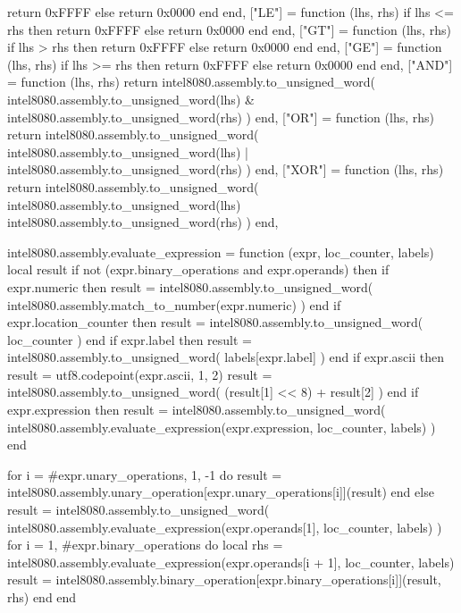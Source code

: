 {            return 0xFFFF
        else
            return 0x0000
        end
    end,
    ["LE"] = function (lhs, rhs)
        if lhs <= rhs then
            return 0xFFFF
        else
            return 0x0000
        end
    end,
    ["GT"] = function (lhs, rhs)
        if lhs > rhs then
            return 0xFFFF
        else
            return 0x0000
        end
    end,
    ["GE"] = function (lhs, rhs)
        if lhs >= rhs then
            return 0xFFFF
        else
            return 0x0000
        end
    end,
    ["AND"] = function (lhs, rhs)
        return intel8080.assembly.to_unsigned_word(
            intel8080.assembly.to_unsigned_word(lhs)
            &
            intel8080.assembly.to_unsigned_word(rhs)
        )
    end,
    ["OR"] = function (lhs, rhs)
        return intel8080.assembly.to_unsigned_word(
            intel8080.assembly.to_unsigned_word(lhs)
            |
            intel8080.assembly.to_unsigned_word(rhs)
        )
    end,
    ["XOR"] = function (lhs, rhs)
        return intel8080.assembly.to_unsigned_word(
            intel8080.assembly.to_unsigned_word(lhs)
            ~
            intel8080.assembly.to_unsigned_word(rhs)
        )
    end,
}

intel8080.assembly.evaluate_expression = function (expr, loc_counter, labels)
    local result
    if not (expr.binary_operations and expr.operands) then
        if expr.numeric then
            result = intel8080.assembly.to_unsigned_word(
                intel8080.assembly.match_to_number(expr.numeric)
            )
        end
        if expr.location_counter then
            result = intel8080.assembly.to_unsigned_word(
                loc_counter
            )
        end
        if expr.label then
            result = intel8080.assembly.to_unsigned_word(
                labels[expr.label]
            )
        end
        if expr.ascii then
            result = {utf8.codepoint(expr.ascii, 1, 2)}
            result = intel8080.assembly.to_unsigned_word(
                (result[1] << 8) + result[2]
            )
        end
        if expr.expression then
            result = intel8080.assembly.to_unsigned_word(
                intel8080.assembly.evaluate_expression(expr.expression, loc_counter, labels)
            )
        end

        for i = #expr.unary_operations, 1, -1 do
            result = intel8080.assembly.unary_operation[expr.unary_operations[i]](result)
        end
    else
        result = intel8080.assembly.to_unsigned_word(
            intel8080.assembly.evaluate_expression(expr.operands[1], loc_counter, labels)
        )
        for i = 1, #expr.binary_operations do
            local rhs = intel8080.assembly.evaluate_expression(expr.operands[i + 1], loc_counter, labels)
            result = intel8080.assembly.binary_operation[expr.binary_operations[i]](result, rhs)
        end
    end

